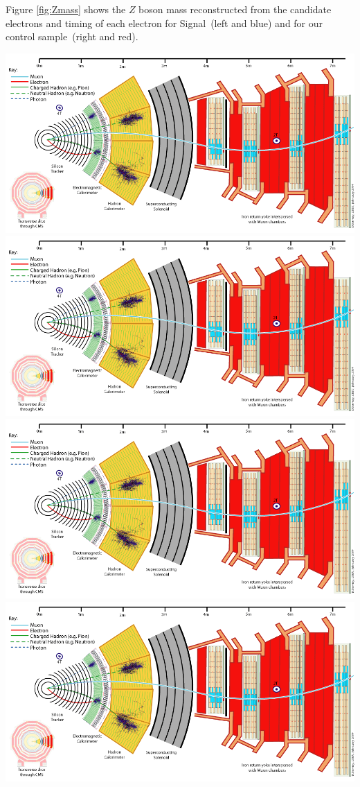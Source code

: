 Figure \ref{fig:Zmass} shows the $Z$ boson mass reconstructed from the candidate electrons and timing of each electron for Signal~(left and blue) and for our control sample~(right and red).

\begin{center}
\centering
\includegraphics[scale=0.2]{THESISPLOTS/CMS_Slice.png}
\includegraphics[scale=0.2]{THESISPLOTS/CMS_Slice.png}
\includegraphics[scale=0.2]{THESISPLOTS/CMS_Slice.png}
\includegraphics[scale=0.2]{THESISPLOTS/CMS_Slice.png}

\end{center}
